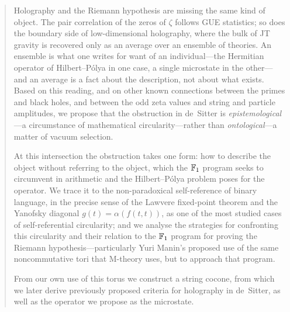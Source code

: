\begin{abstract}
Holography and the Riemann hypothesis are missing the same kind of object. The pair correlation of the zeros of
$\zeta$ follows GUE statistics; so does the boundary side of low-dimensional holography,
where the bulk of JT gravity is recovered only as an average over an ensemble of theories.
An ensemble is what one writes for want of an individual---the Hermitian operator of
Hilbert--P\'olya in one case, a single microstate in the other---and an average is a fact
about the description, not about what exists. Based on this reading, and on other known
connections between the primes and black holes, and between the odd zeta values and
string and particle amplitudes, we propose that the obstruction in de~Sitter is
\emph{epistemological}---a circumstance of mathematical circularity---rather than
\emph{ontological}---a matter of vacuum selection.

At this intersection the obstruction takes one form: how to describe the object without
referring to the object, which the $\F_1$ program seeks to circumvent in arithmetic and
the Hilbert--P\'olya problem poses for the operator. We trace it to the non-paradoxical
self-reference of binary language, in the precise sense of the Lawvere fixed-point theorem
and the Yanofsky diagonal $g(t)=\alpha(f(t,t))$, as one of the most studied cases of
self-referential circularity; and we analyse the strategies for confronting this
circularity and their relation to the $\F_1$ program for proving the Riemann
hypothesis---particularly Yuri Manin's proposed use of the same noncommutative tori that
M-theory uses, but to approach that program.

From our own use of this torus we construct a string cocone, from which we later derive
previously proposed criteria for holography in de~Sitter, as well as the operator we
propose as the microstate.
\end{abstract}
